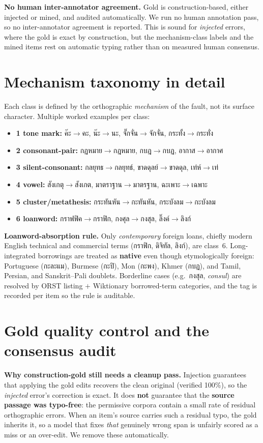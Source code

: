 \documentclass[11pt]{article}
\begin{document}
\textbf{No human inter-annotator agreement.} Gold is construction-based, either injected or
mined, and audited automatically. We run no human annotation pass, so no inter-annotator
agreement is reported. This is sound for \emph{injected} errors, where the gold is exact by
construction, but the mechanism-class labels and the mined items rest on automatic typing
rather than on measured human consensus.




\appendix

\section{Mechanism taxonomy in detail}
\label{app:taxonomy}
Each class is defined by the orthographic \emph{mechanism} of the fault, not its surface
character. Multiple worked examples per class:
\begin{itemize}\itemsep1pt
\item \textbf{1 tone mark:} ค๊ะ$\to$คะ, น๊ะ$\to$นะ, จั๊กจั่น$\to$จักจั่น, กระทั้ง$\to$กระทั่ง
\item \textbf{2 consonant-pair:} กฏหมาย$\to$กฎหมาย, กบฎ$\to$กบฏ, อากาส$\to$อากาศ
\item \textbf{3 silent-consonant:} กลยุทธ$\to$กลยุทธ์, ขาดดุลย์$\to$ขาดดุล, เท่ห์$\to$เท่
\item \textbf{4 vowel:} สังเกตุ$\to$สังเกต, มาตราฐาน$\to$มาตรฐาน, ฉะเพาะ$\to$เฉพาะ
\item \textbf{5 cluster/metathesis:} กระทันหัน$\to$กะทันหัน, กระบังลม$\to$กะบังลม
\item \textbf{6 loanword:} กราฟฟิค$\to$กราฟิก, กงศุล$\to$กงสุล, ลิ๊งค์$\to$ลิงก์
\end{itemize}
\textbf{Loanword-absorption rule.} Only \emph{contemporary} foreign loans, chiefly modern
English technical and commercial terms (กราฟิก, ดิจิทัล, ลิงก์), are class~6. Long-integrated
borrowings are treated as \textbf{native} even though etymologically foreign: Portuguese
(กะละแม), Burmese (กะปิ), Mon (กะพง), Khmer (กบฏ), and Tamil, Persian, and Sanskrit--Pali
doublets. Borderline cases (e.g.\ กงสุล, \emph{consul}) are resolved by ORST listing $+$
Wiktionary borrowed-term categories, and the tag is recorded per item so the rule is auditable.

\section{Gold quality control and the consensus audit}
\label{app:qc}
\textbf{Why construction-gold still needs a cleanup pass.} Injection guarantees that applying
the gold edits recovers the clean original (verified 100\%), so the \emph{injected} error's
correction is exact. It does \textbf{not} guarantee that the \textbf{source passage was
typo-free}: the permissive corpora contain a small rate of residual orthographic errors. When
an item's source carries such a residual typo, the gold inherits it, so a model that fixes
\emph{that} genuinely wrong span is unfairly scored as a miss or an over-edit. We remove these
automatically.
\end{document}
